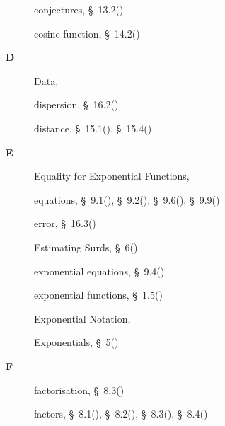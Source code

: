 \begin{multicols}{2}
{\begin{description}
	  \item[] \noindent\raggedright conjectures,  \S~13.2(\pageref{m39352})
	  
	  \item[] \noindent\raggedright cosine function,  \S~14.2(\pageref{m39408})
	  \vspace{.3cm}
	  \item[{\large \bfseries D}]\noindent\raggedright
	  Data,  \pageref{id2616525}
	  
	  \item[] \noindent\raggedright dispersion,  \S~16.2(\pageref{m39400})
	  
	  \item[] \noindent\raggedright distance,  \S~15.1(\pageref{m39107}),  \S~15.4(\pageref{m39167})
	  \vspace{.3cm}
	  \item[{\large \bfseries E}]\noindent\raggedright
	  Equality for Exponential Functions,  \pageref{id2537261}
	  
	  \item[] \noindent\raggedright equations,  \S~9.1(\pageref{m39250}),  \S~9.2(\pageref{m39241}),  \S~9.6(\pageref{m39257}),  \S~9.9(\pageref{m39263})
	  
	  \item[] \noindent\raggedright error,  \S~16.3(\pageref{m39404})
	  
	  \item[] \noindent\raggedright Estimating Surds,  \S~6(\pageref{m38347})
	  
	  \item[] \noindent\raggedright exponential equations,  \S~9.4(\pageref{m39253})
	  
	  \item[] \noindent\raggedright exponential functions,  \S~1.5(\pageref{m39348})
	  
	  \item[] \noindent\raggedright Exponential Notation,  \pageref{id2492834}
	  
	  \item[] \noindent\raggedright Exponentials,  \S~5(\pageref{m38359})
	  \vspace{.3cm}
	  \item[{\large \bfseries F}]\noindent\raggedright
	  factorisation,  \S~8.3(\pageref{m39394})
	  
	  \item[] \noindent\raggedright factors,  \S~8.1(\pageref{m39383}),  \S~8.2(\pageref{m39387}),  \S~8.3(\pageref{m39394}),  \S~8.4(\pageref{m39392})
	  

\end{description}}
\end{multicols}
